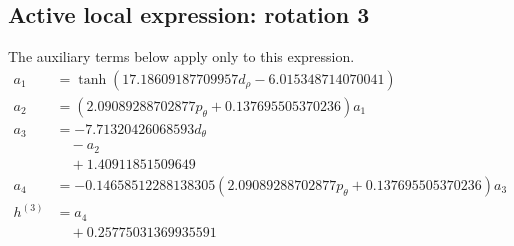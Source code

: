 \subsection*{Active local expression: rotation 3}
The auxiliary terms below apply only to this expression.
\begin{align*}
a_{1} &= \tanh{\left(17.18609187709957 d_\rho - 6.015348714070041 \right)} \\
a_{2} &= \left(2.09089288702877 p_\theta + 0.137695505370236\right) a_{1} \\
a_{3} &= - 7.71320426068593 d_\theta \\
&\quad - a_{2} \\
&\quad + 1.40911851509649 \\
a_{4} &= - 0.14658512288138305 \left(2.09089288702877 p_\theta + 0.137695505370236\right) a_{3} \\
h^{(3)} &= a_{4} \\
&\quad + 0.25775031369935591
\end{align*}

\endgroup
